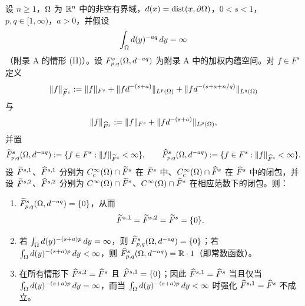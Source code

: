 \begin{theorem}
设 $n\ge 1$，$\Omega$ 为 $\mathbb{R}^n$ 中的非空有界域，$d(x)=\operatorname{dist}(x,\partial\Omega)$，$0<s<1$，$p,q\in[1,\infty)$，$a>0$，并假设
\[
  \int_\Omega d(y)^{-aq}\,dy=\infty
\]
（附录 A 的情形 (II)）。设 $F^s_{p,q}(\Omega,d^{-aq})$ 为附录 A 中的加权内蕴空间。对 $f\in F^s$ 定义
\[
  \|f\|_{\widetilde F^s}:=\|f\|_{F^s}
  +\|f d^{-(s+a)}\|_{L^p(\Omega)}
  +\|f d^{-(s+a+n/q)}\|_{L^q(\Omega)}
\]
与
\[
  \|f\|_{\widehat F^s}:=\|f\|_{F^s}+\|f d^{-(s+a)}\|_{L^p(\Omega)} ,
\]
并置
\[
  \widetilde F^s_{p,q}(\Omega,d^{-aq}):=\{f\in F^s : \|f\|_{\widetilde F^s}<\infty\},
  \qquad
  \widehat F^s_{p,q}(\Omega,d^{-aq}):=\{f\in F^s : \|f\|_{\widehat F^s}<\infty\} .
\]
设 $\widetilde F^{s,1}$、$\widehat F^{s,1}$ 分别为 $C_c^\infty(\Omega)\cap\widetilde F^s$ 在 $\widetilde F^s$ 中、$C_c^\infty(\Omega)\cap\widehat F^s$ 在 $\widehat F^s$ 中的闭包，并设 $\widetilde F^{s,2}$、$\widehat F^{s,2}$ 分别为 $C^\infty(\Omega)\cap\widetilde F^s$、$C^\infty(\Omega)\cap\widehat F^s$ 在相应范数下的闭包。则：
\begin{enumerate}[label=(\roman*)]
  \item $\widetilde F^s_{p,q}(\Omega,d^{-aq})=\{0\}$，从而
  \[
    \widetilde F^{s,1}=\widetilde F^{s,2}=\widetilde F^s=\{0\} .
  \]
  \item 若 $\int_\Omega d(y)^{-(s+a)p}\,dy=\infty$，则 $\widehat F^s_{p,q}(\Omega,d^{-aq})=\{0\}$；若 $\int_\Omega d(y)^{-(s+a)p}\,dy<\infty$，则 $\widehat F^s_{p,q}(\Omega,d^{-aq})=\mathbb{R}\cdot 1$（即常数函数）。
  \item 在所有情形下 $\widehat F^{s,2}=\widehat F^s$ 且 $\widehat F^{s,1}=\{0\}$；因此 $\widehat F^{s,1}=\widehat F^s$ 当且仅当 $\int_\Omega d(y)^{-(s+a)p}\,dy=\infty$，而当 $\int_\Omega d(y)^{-(s+a)p}\,dy<\infty$ 时强化 $\widehat F^{s,1}=\widehat F^s$ 不成立。
\end{enumerate}
\end{theorem}


